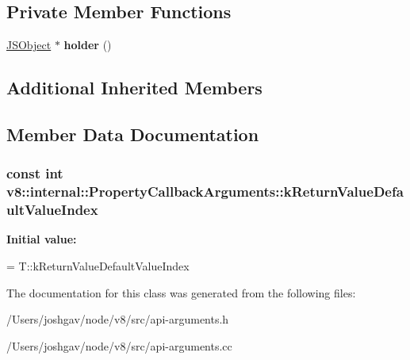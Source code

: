 \subsection*{Private Member Functions}
\begin{DoxyCompactItemize}
\item 
\hyperlink{classv8_1_1internal_1_1_j_s_object}{J\+S\+Object} $\ast$ {\bfseries holder} ()\hypertarget{classv8_1_1internal_1_1_property_callback_arguments_a0f010833e47edb1a01cf0dfb482fb2d9}{}\label{classv8_1_1internal_1_1_property_callback_arguments_a0f010833e47edb1a01cf0dfb482fb2d9}

\end{DoxyCompactItemize}
\subsection*{Additional Inherited Members}


\subsection{Member Data Documentation}
\subsubsection[{\texorpdfstring{k\+Return\+Value\+Default\+Value\+Index}{kReturnValueDefaultValueIndex}}]{\setlength{\rightskip}{0pt plus 5cm}const int v8\+::internal\+::\+Property\+Callback\+Arguments\+::k\+Return\+Value\+Default\+Value\+Index\hspace{0.3cm}{\ttfamily [static]}}\hypertarget{classv8_1_1internal_1_1_property_callback_arguments_af4efd2b3fe140e2f70f82a004ea9cd4a}{}\label{classv8_1_1internal_1_1_property_callback_arguments_af4efd2b3fe140e2f70f82a004ea9cd4a}
{\bfseries Initial value\+:}
\begin{DoxyCode}
=
      T::kReturnValueDefaultValueIndex
\end{DoxyCode}


The documentation for this class was generated from the following files\+:\begin{DoxyCompactItemize}
\item 
/\+Users/joshgav/node/v8/src/api-\/arguments.\+h\item 
/\+Users/joshgav/node/v8/src/api-\/arguments.\+cc\end{DoxyCompactItemize}

